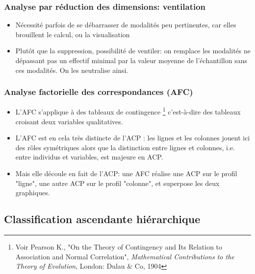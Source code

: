 \documentclass{beamer}
\begin{document}
\begin{frame}[fragile]

\frametitle{Analyse par réduction des dimensions: ventilation}

\begin{itemize}
\item Nécessité parfois de se débarrasser de modalités peu pertinentes, car elles brouillent le calcul, ou la visualisation
\item Plutôt que la suppression, possibilité de ventiler: on remplace les modalités ne dépassant pas un effectif minimal par la valeur moyenne de l'échantillon sans ces modalités. On les neutralise ainsi.
\end{itemize}
\end{frame}


\begin{frame}[fragile]
\frametitle{Analyse factorielle des correspondances (AFC)}

\begin{itemize}
	\item L'AFC s’applique à des \alert{tableaux de contingence} \footnote{Voir Pearson K., "On the Theory of Contingency and Its Relation to Association and Normal Correlation", \textit{Mathematical Contributions to the Theory of Evolution}, London: Dulau $\&$ Co, 1904} c'est-à-dire des tableaux croisant deux variables qualitatives.
	\item L'AFC est en cela très distincte de l'ACP :  les lignes et les colonnes jouent ici des rôles symétriques alors que la distinction entre lignes et colonnes, i.e. entre individus et variables, est majeure en ACP.
	\item Mais elle découle en fait de l'ACP: une AFC réalise une ACP sur le profil "ligne", une autre ACP sur le profil "colonne", et superpose les deux graphiques.
	
\end{itemize}
\end{frame}

\subsection{Classification ascendante hiérarchique}
\end{document}
